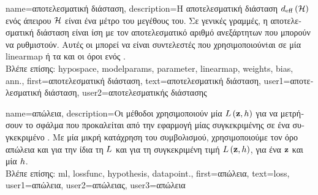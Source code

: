 {name={\foreignlanguage{greek}{αποτελεσματική διάσταση}},
	description={\foreignlanguage{greek}{Η αποτελεσματική διάσταση} 
		$d_{\rm eff} \left( \mathcal{H} \right)$ \foreignlanguage{greek}{ενός ά\-πειρου}  $\mathcal{H}$ \foreignlanguage{greek}{είναι ένα μέτρο του μεγέθους του. 
		Σε γενικές γραμμές, η αποτελεσματική διάσταση είναι ίση με τον αποτελεσματικό αριθμό ανεξάρτητων} 
		 \foreignlanguage{greek}{που μπορούν να ρυθμιστούν. Αυτές οι}
		 \foreignlanguage{greek}{μπορεί να είναι συντελεστές που χρησιμοποιούνtαι σε μία} \gls{linearmap} 
		\foreignlanguage{greek}{ή τα}  \foreignlanguage{greek}{και οι όροι}  \foreignlanguage{greek}{ενός} .\\
		\foreignlanguage{greek}{Βλέπε επίσης:} \gls{hypospace}, \gls{modelparams}, \gls{parameter}, \gls{linearmap}, \gls{weights}, \gls{bias}, \gls{ann}.},
	first={\foreignlanguage{greek}{αποτελεσματική διάσταση}},
	text={\foreignlanguage{greek}{αποτελεσματική διάσταση}},
	user1={\foreignlanguage{greek}{αποτελεσματική διάσταση}}, %
	user2={\foreignlanguage{greek}{αποτελεσματικής διάστασης}} %
}

{name={\foreignlanguage{greek}{απώλεια}}, 
	description={\foreignlanguage{greek}{Οι μέθοδοι}  
		\foreignlanguage{greek}{χρησιμοποιούν μία}  $L\left({\bf z},h \right)$ \foreignlanguage{greek}{για 
		να μετρήσουν το σφάλμα που προκαλείται από την εφαρμογή μίας  
		συγκεκριμένης}  \foreignlanguage{greek}{σε ένα συγκεκριμένο} . \foreignlanguage{greek}{Με 
		μία μικρή κατάχρηση του συμβολισμού, χρησιμοποιούμε τον όρο απώλεια και για την ίδια τη}  $L$ 
		\foreignlanguage{greek}{και για τη συγκεκριμένη τιμή} $L\left({\bf z},h \right)$, \foreignlanguage{greek}{για ένα} 
		 ${\bf z}$ \foreignlanguage{greek}{και μία}  $h$.\\
		\foreignlanguage{greek}{Βλέπε επίσης:} \gls{ml}, \gls{lossfunc}, \gls{hypothesis}, \gls{datapoint}.},
	first={\foreignlanguage{greek}{απώλεια}},
	text={loss},
	user1={\foreignlanguage{greek}{απώλεια}}, %
	user2={\foreignlanguage{greek}{απώλειας}}, %
	user3={\foreignlanguage{greek}{απώλεια}} %
}

